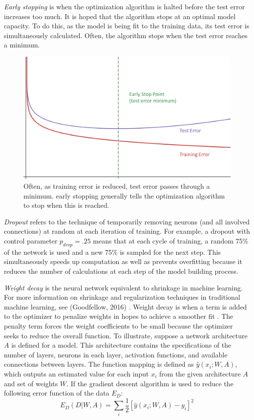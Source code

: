\textit{Early stopping} is when the optimization algorithm is halted before the test error increases too much.  It is hoped that the algorithm stops at an optimal model capacity. To do this, as the model is being fit to the training data, its test error is simultaneously calculated. 
 Often, the algorithm stops when the test error reaches a minimum. \cite{doan2004generalization}

 \begin{figure}[H]
    \centering
    \vspace{-0pt}
    \includegraphics[width=0.5\linewidth]{Figures/early_stop.png}
    \caption{\footnotesize Often, as training error is reduced, test error passes through a minimum.  early stopping generally tells the optimization algorithm to stop when this is reached.}
    \label{earlystop}
\end{figure}

\textit{Dropout} refers to the technique of temporarily removing neurons (and all involved connections) at random  at each iteration of training.\cite{srivastava2014dropout}  For example, a dropout with control parameter $p_{drop} = .25$ means that at each cycle of training, a random 75\% of the network is used and a new 75\% is sampled for the next step. This simultaneously speeds up computation as well as prevents overfitting because it reduces the number of calculations at each step of the model building process.

\textit{Weight decay} is the neural network equivalent to shrinkage in machine learning.  For more information on shrinkage and regularization techniques in traditional machine learning, see (Goodfellow, 2016) \cite{Goodfellow-et-al-2016}.
Weight decay is when a  term is added to the optimizer to penalize weights in hopes to achieve a smoother fit \cite{mackay1992practical}.  The penalty term forces the weight coefficients to be small because the optimizer seeks to reduce the overall function.  To illustrate, suppose a network architecture $A$ is defined for a model.  This architecture contains the specifications of the number of layers, neurons in each layer, activation functions, and available connections between layers.  The function mapping is defined as $\hat{y}(x_i;W,A)$, which outputs an estimated value for each input $x_i$ from the given architecture $A$ and set of weights $W$.  If the gradient descent algorithm is used to reduce the following error function of the data $E_D$:
$$
E_D(D|W,A) = \sum_i \frac{1}{2} [\hat{y}(x_i;W,A) - y_i]^2
$$

